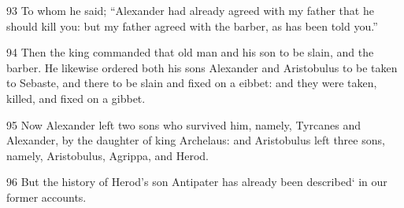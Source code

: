 \par 93 To whom he said; “Alexander had already agreed with my father that he should kill you: but my father agreed with the barber, as has been told you.” 

\par 94 Then the king commanded that old man and his son to be slain, and the barber. He likewise ordered both his sons Alexander and Aristobulus to be taken to Sebaste, and there to be slain and fixed on a eibbet: and they were taken, killed, and fixed on a gibbet.

\par 95 Now Alexander left two sons who survived him, namely, Tyrcanes and Alexander, by the daughter of king Archelaus: and Aristobulus left three sons, namely, Aristobulus, Agrippa, and Herod. 

\par 96 But the history of Herod’s son Antipater has already been described‘ in our former accounts.

